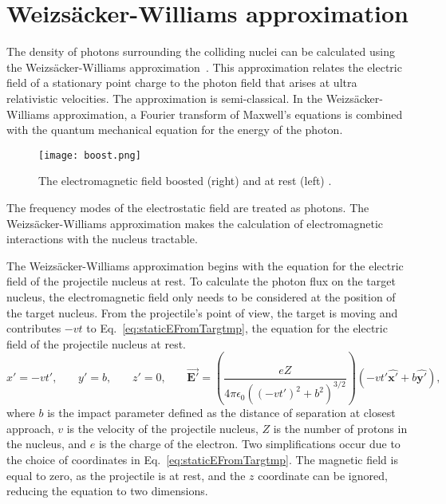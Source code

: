   \section{Weizs\"{a}cker-Williams approximation \label{sec:wwAprox}}
    The density of photons surrounding the colliding nuclei can be calculated 
      using the Weizs\"{a}cker-Williams approximation~\cite{vonWeizsacker:1934sx,Williams:1934ad}. 
    This approximation relates the electric field of a stationary point charge 
      to the photon field that arises at ultra relativistic velocities. 
    The approximation is semi-classical. 
    In the Weizs\"{a}cker-Williams approximation, a Fourier transform of Maxwell's 
      equations is combined with the quantum mechanical equation for the energy of the photon.   
    \begin{figure}[!Hhbt]
      \begin{center}
        \texttt{[image: boost.png]}
      \end{center}
      \caption{ \label{fig:boost} The electromagnetic field boosted (right) and 
        at rest (left) \cite{WWJackson}.}
    \end{figure}
    The frequency modes of the electrostatic field are treated as photons. 
    The Weizs\"{a}cker-Williams approximation makes the calculation of 
      electromagnetic interactions with the nucleus tractable. 

    The Weizs\"{a}cker-Williams approximation begins with the equation for the 
      electric field of the projectile nucleus at rest. 
    To calculate the photon flux on the target nucleus, the electromagnetic field 
      only needs to be considered at the position of the target nucleus. 
    From the projectile's point of view, the target is moving and contributes
     $-vt$ to Eq.~\ref{eq:staticEFromTargtmp}, the equation for the electric 
     field of the projectile nucleus at rest.
    \begin{equation} \label{eq:staticEFromTargtmp}
        x'=-vt'\textrm{,}\qquad
        y'=b\textrm{,}\qquad
        z'=0\textrm{,}\qquad
        \vec{\mathbf{E'}}=\left(\frac{eZ}
         {4 \pi \epsilon_{0}\left(\left(-vt'\right)^{2}+b^{2}\right)^{3/2}}\right)
         \left(-vt'{\mathbf{\hat{x'}}+b\mathbf{\hat{y'}}}\right)\textrm{,}
    \end{equation}        
      where $b$ is the impact parameter
      defined as the distance of separation at closest approach, $v$ is the velocity of the 
      projectile nucleus, $Z$ is the number of protons in the nucleus, and $e$ 
      is the charge of the electron.
    Two simplifications occur due to the choice of coordinates in 
      Eq.~\ref{eq:staticEFromTargtmp}.
    The magnetic field is equal to zero, as the projectile is at rest, and
      the $z$ coordinate can be ignored, reducing the equation to two dimensions. 

